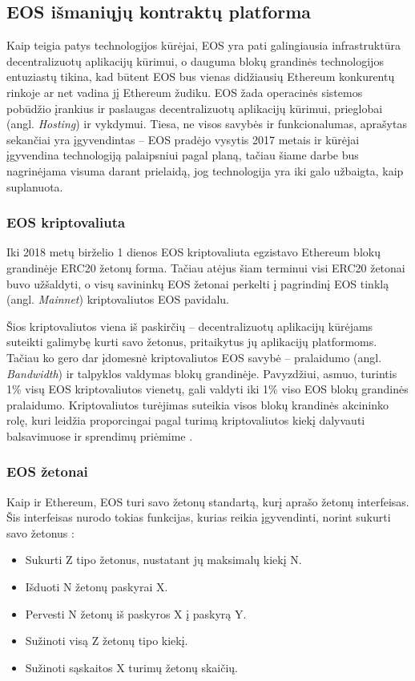 \documentclass{VUMIFPSkursinis}
\begin{document}
\clearpage

\subsection{EOS išmaniųjų kontraktų platforma}
Kaip teigia patys technologijos kūrėjai, EOS yra pati galingiausia infrastruktūra decentralizuotų aplikacijų kūrimui, o dauguma blokų grandinės technologijos entuziastų tikina, kad būtent EOS bus vienas didžiausių Ethereum konkurentų rinkoje ar net vadina jį Ethereum žudiku. EOS žada operacinės sistemos pobūdžio įrankius ir paslaugas decentralizuotų aplikacijų kūrimui, prieglobai (angl. \textit{Hosting}) ir vykdymui. Tiesa, ne visos savybės ir funkcionalumas, aprašytas sekančiai yra įgyvendintas – EOS pradėjo vysytis 2017 metais ir kūrėjai įgyvendina technologiją palaipsniui pagal planą, tačiau šiame darbe bus nagrinėjama visuma darant prielaidą, jog technologija yra iki galo užbaigta, kaip suplanuota.

\subsubsection{EOS kriptovaliuta}
Iki 2018 metų birželio 1 dienos EOS kriptovaliuta egzistavo Ethereum blokų grandinėje ERC20 žetonų forma. Tačiau atėjus šiam terminui visi ERC20 žetonai buvo užšaldyti, o visų savininkų EOS žetonai perkelti į pagrindinį EOS tinklą (angl. \textit{Mainnet}) kriptovaliutos EOS pavidalu. 

Šios kriptovaliutos viena iš paskirčių – decentralizuotų aplikacijų kūrėjams suteikti galimybę kurti savo žetonus, pritaikytus jų aplikacijų platformoms. Tačiau ko gero dar įdomesnė kriptovaliutos EOS savybė – pralaidumo (angl. \textit{Bandwidth}) ir talpyklos valdymas blokų grandinėje. Pavyzdžiui, asmuo, turintis 1\% visų EOS kriptovaliutos vienetų, gali valdyti iki 1\% viso EOS blokų grandinės pralaidumo. Kriptovaliutos turėjimas suteikia visos blokų krandinės akcininko rolę, kuri leidžia proporcingai pagal turimą kriptovaliutos kiekį dalyvauti balsavimuose ir sprendimų priėmime \cite{Cox2018next}.

\subsubsection{EOS žetonai}
Kaip ir Ethereum, EOS turi savo žetonų standartą, kurį aprašo žetonų interfeisas. Šis interfeisas nurodo tokias funkcijas, kurias reikia įgyvendinti, norint sukurti savo žetonus \cite{Cox2018next}:
\begin{itemize}
    \item Sukurti Z tipo žetonus, nustatant jų maksimalų kiekį N.
    \item Išduoti N žetonų paskyrai X.
    \item Pervesti N žetonų iš paskyros X į paskyrą Y.
    \item Sužinoti visą Z žetonų tipo kiekį.
    \item Sužinoti sąskaitos X turimų žetonų skaičių.
\end{itemize}
\end{document}
